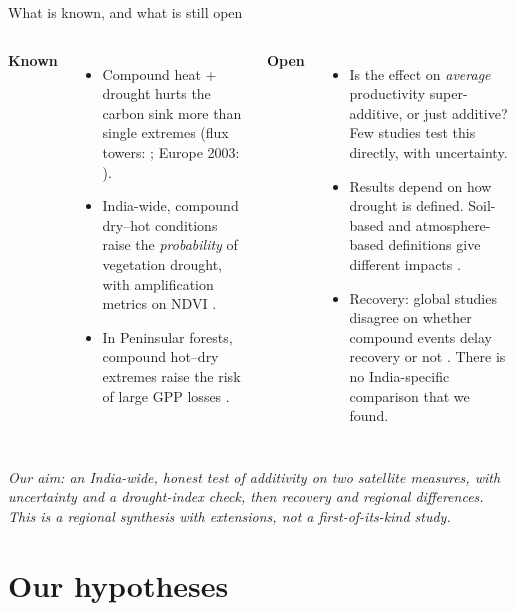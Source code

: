 \documentclass[11pt,aspectratio=169]{beamer}
\begin{document}
\begin{frame}{What is known, and what is still open}
  \scriptsize
  \begin{columns}[T]
    \textbf{Known}
    \begin{itemize}
      \item Compound heat + drought hurts the carbon sink more than single
        extremes (flux towers: \citealp{vonbuttlar2018}; Europe 2003:
        \citealp{ciais2005}).
      \item India-wide, compound dry--hot conditions raise the
        \emph{probability} of vegetation drought, with amplification
        metrics on NDVI \citep{meena2026}.
      \item In Peninsular forests, compound hot--dry extremes raise the risk
        of large GPP losses \citep{sen2026}.
    \end{itemize}
    \textbf{Open}
    \begin{itemize}
      \item Is the effect on \emph{average} productivity super-additive, or
        just additive? Few studies test this directly, with uncertainty.
      \item Results depend on how drought is defined. Soil-based and
        atmosphere-based definitions give different impacts
        \citep{liang2026}.
      \item Recovery: global studies disagree on whether compound events
        delay recovery \citep{yao2024,huang2025} or not \citep{feng2026}.
        There is no India-specific comparison that we found.
    \end{itemize}
  \end{columns}
  \vspace{6pt}
  \textit{Our aim: an India-wide, honest test of additivity on two
  satellite measures, with uncertainty and a drought-index check, then
  recovery and regional differences. This is a regional synthesis with
  extensions, not a first-of-its-kind study.}
\end{frame}

\section{Our hypotheses}
\end{document}
